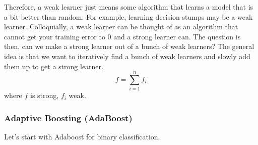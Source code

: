         Therefore, a weak learner just means some algorithm that learns a model that is a bit better than random. For example, learning decision stumps may be a weak learner. Colloquially, a weak learner can be thought of as an algorithm that cannot get your training error to $0$ and a strong learner can. The question is then, can we make a strong learner out of a bunch of weak learners? The general idea is that we want to iteratively find a bunch of weak learners and slowly add them up to get a strong learner. 
        \begin{equation}
          f = \sum_{i=1}^n f_i
        \end{equation}
        where $f$ is strong, $f_i$ weak. 

      \subsubsection{Adaptive Boosting (AdaBoost)} 

        Let's start with Adaboost for binary classification. 

